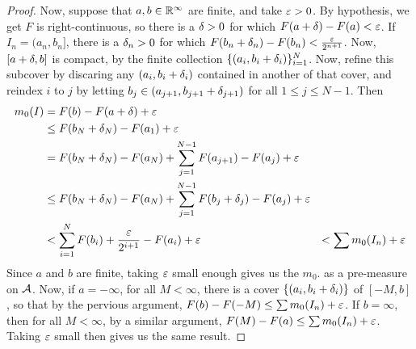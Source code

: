 \begin{proof}
    Now, suppose that $a,b \in \mathbb{R}^\infty$ are finite, and take $\varepsilon>0$. By
    hypothesis, we get  $F$ is right-continuous, so there is a  $\delta>0$ for which
     $F(a+\delta)-F(a)<\varepsilon$. If $I_n=(a_n,b_n]$, there is a $\delta_n>0$ for which
     $F(b_n+\delta_n)-F(b_n)<\frac{\varepsilon}{2^{n+1}}$. Now, $[a+\delta,b]$ is compact, by the
     finite collection $\{(a_i,b_i+\delta_i)\}_{i=1}^N$. Now, refine this subcover by
     discaring any $(a_i,b_i+\delta_i)$ contained in another of that cover, and
     reindex $i$ to $j$ by letting $b_j \in (a_{j+1},b_{j+1}+\delta_{j+1})$ for all
     $1 \leq j \leq N-1$. Then
     \begin{align*}
         m_0(I)     &=      F(b)-F(a+\delta)+\varepsilon \\
                    &\leq   F(b_N+\delta_N)-F(a_1)+\varepsilon \\
                    &=      F(b_N+\delta_N)-F(a_N)+\sum_{j=1}^{N-1}{F(a_{j+1})-F(a_j)}+\varepsilon \\
                    &\leq   F(b_N+\delta_N)-F(a_N)+\sum_{j=1}^{N-1}{F(b_j+\delta_j)-F(a_j)}+\varepsilon \\
                    &<   \sum_{i=1}^N{F(b_i)+\frac{\varepsilon}{2^{i+1}}-F(a_i)}+\varepsilon
                    &<   \sum{m_0(I_n)}+\varepsilon
     \end{align*}
     Since $a$ and  $b$ are finite, taking  $\varepsilon$ small enough gives us the
     $m_0$. as a pre-measure on $\mathcal{A}$. Now, if $a=-\infty$, for all  $M<\infty$,
     there is a cover  $\{(a_i,b_i+\delta_i)\}$ of $[-M,b]$, so that by the pervious
     argument, $F(b)-F(-M) \leq \sum{m_0(I_n)}+\varepsilon$. If $b=\infty$, then for all
      $M<\infty$, by a similar argument,  $F(M)-F(a) \leq\sum{m_0(I_n)}+\varepsilon$.
      Taking $\varepsilon$ small then gives us the same result.
\end{proof}

